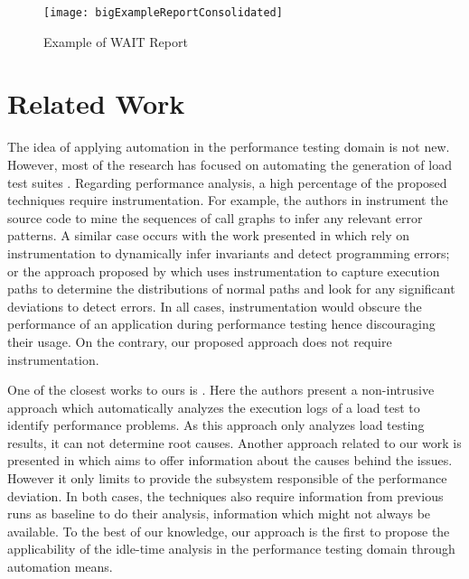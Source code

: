 \documentclass[runningheads,a4paper]{llncs}
\begin{document}
\begin{figure}[!h]
\centering
\texttt{[image: bigExampleReportConsolidated]}
\caption{Example of WAIT Report}
\label{fig_WAITReport}
\end{figure}

\vspace{-10pt}
\section{Related Work}
\vspace{-5pt}
The idea of applying automation in the performance testing domain is not new.
However, most of the research has focused on automating the generation of load
test suites
\cite{Chen1,Elvira1,Zhang1,Briand1,Bayan1,Avritzer2,Avritzer3,Garousi1}.
Regarding performance analysis, a high percentage of the proposed
techniques require instrumentation. For example, the authors in \cite{Yang1}
instrument the source code to mine the sequences of call graphs to infer any
relevant error patterns. A similar case occurs with the work presented in
\cite{Hangal1,Csallner1} which rely on instrumentation to dynamically infer
invariants and detect programming errors; or the approach proposed by
\cite{Chen2} which uses instrumentation to capture execution paths to determine
the distributions of normal paths and look for any significant deviations to
detect errors. In all cases, instrumentation would obscure the performance of an
application during performance testing hence discouraging their usage. On the
contrary, our proposed approach does not require instrumentation.

One of the closest works to ours is \cite{Jiang2009}. Here the authors present a
non-intrusive approach which automatically analyzes the execution logs of a load
test to identify performance problems. As this approach only analyzes load
testing results, it can not determine root causes. Another approach related
to our work is presented in \cite{Malik1} which aims to offer information about
the causes behind the issues. However it only limits to provide the subsystem
responsible of the performance deviation. In both cases, the techniques also
require information from previous runs as baseline to do their analysis,
information which might not always be available. To the best of our knowledge,
our approach is the first to propose the applicability of the idle-time analysis
in the performance testing domain through automation means.
\end{document}
